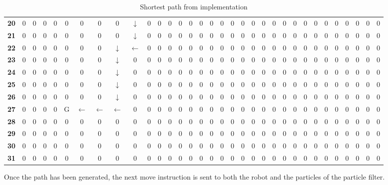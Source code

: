 \documentclass[Main]{subfiles}
\begin{document}
\begin{table}[H]
{\begin{tabular}{ccccccccccccccccccccccccccccccccc}
			\textbf{20} &  0 &  0 &  0 &  0 &  0 &  0 &  0 &  0 &  $\downarrow$ &  0 &  0 &  0 &  0 &  0 &  0 &  0 &  0 &  0 &  0 &  0 &  0 &  0 &  0 &  0 &  0 &  0 &  0 &  0 &  0 &  0 &  0 &  0 \\
			\textbf{21} &  0 &  0 &  0 &  0 &  0 &  0 &  0 &  0 &  $\downarrow$ &  0 &  0 &  0 &  0 &  0 &  0 &  0 &  0 &  0 &  0 &  0 &  0 &  0 &  0 &  0 &  0 &  0 &  0 &  0 &  0 &  0 &  0 &  0 \\
			\textbf{22} &  0 &  0 &  0 &  0 &  0 &  0 &  0 &  $\downarrow$ &  $\leftarrow$ &  0 &  0 &  0 &  0 &  0 &  0 &  0 &  0 &  0 &  0 &  0 &  0 &  0 &  0 &  0 &  0 &  0 &  0 &  0 &  0 &  0 &  0 &  0 \\
			\textbf{23} &  0 &  0 &  0 &  0 &  0 &  0 &  0 &  $\downarrow$ &  0 &  0 &  0 &  0 &  0 &  0 &  0 &  0 &  0 &  0 &  0 &  0 &  0 &  0 &  0 &  0 &  0 &  0 &  0 &  0 &  0 &  0 &  0 &  0 \\
			\textbf{24} &  0 &  0 &  0 &  0 &  0 &  0 &  0 &  $\downarrow$ &  0 &  0 &  0 &  0 &  0 &  0 &  0 &  0 &  0 &  0 &  0 &  0 &  0 &  0 &  0 &  0 &  0 &  0 &  0 &  0 &  0 &  0 &  0 &  0 \\
			\textbf{25} &  0 &  0 &  0 &  0 &  0 &  0 &  0 &  $\downarrow$ &  0 &  0 &  0 &  0 &  0 &  0 &  0 &  0 &  0 &  0 &  0 &  0 &  0 &  0 &  0 &  0 &  0 &  0 &  0 &  0 &  0 &  0 &  0 &  0 \\
			\textbf{26} &  0 &  0 &  0 &  0 &  0 &  0 &  0 &  $\downarrow$ &  0 &  0 &  0 &  0 &  0 &  0 &  0 &  0 &  0 &  0 &  0 &  0 &  0 &  0 &  0 &  0 &  0 &  0 &  0 &  0 &  0 &  0 &  0 &  0 \\
			\textbf{27} &  0 &  0 &  0 &  0 &  G &  $\leftarrow$  &  $\leftarrow$ &  $\leftarrow$ &  0 &  0 &  0 &  0 &  0 &  0 &  0 &  0 &  0 &  0 &  0 &  0 &  0 &  0 &  0 &  0 &  0 &  0 &  0 &  0 &  0 &  0 &  0 &  0 \\
			\textbf{28} &  0 &  0 &  0 &  0 &  0 &  0 &  0 &  0 &  0 &  0 &  0 &  0 &  0 &  0 &  0 &  0 &  0 &  0 &  0 &  0 &  0 &  0 &  0 &  0 &  0 &  0 &  0 &  0 &  0 &  0 &  0 &  0 \\
			\textbf{29} &  0 &  0 &  0 &  0 &  0 &  0 &  0 &  0 &  0 &  0 &  0 &  0 &  0 &  0 &  0 &  0 &  0 &  0 &  0 &  0 &  0 &  0 &  0 &  0 &  0 &  0 &  0 &  0 &  0 &  0 &  0 &  0 \\
			\textbf{30} &  0 &  0 &  0 &  0 &  0 &  0 &  0 &  0 &  0 &  0 &  0 &  0 &  0 &  0 &  0 &  0 &  0 &  0 &  0 &  0 &  0 &  0 &  0 &  0 &  0 &  0 &  0 &  0 &  0 &  0 &  0 &  0 \\
			\textbf{31} &  0 &  0 &  0 &  0 &  0 &  0 &  0 &  0 &  0 &  0 &  0 &  0 &  0 &  0 &  0 &  0 &  0 &  0 &  0 &  0 &  0 &  0 &  0 &  0 &  0 &  0 &  0 &  0 &  0 &  0 &  0 &  0 \\
			\end{tabular}
		}
		\caption{Shortest path from implementation}
		\label{table:impl_pathmap} 
	\end{table} \noindent
	Once the path has been generated, the next move instruction is sent to both the robot and the particles of the particle filter.
	
\end{document}
